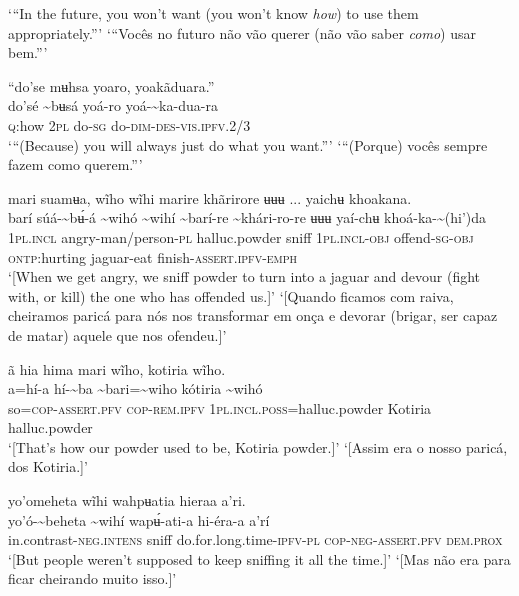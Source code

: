 \documentclass[output=paper,
modfonts,nonflat
]{langsci/langscibook}
\begin{document}
\glt ‘“In the future, you won't want (you won’t know \textit{how}) to use them appropriately.”’
\glt ‘“Vocês no futuro não vão querer (não vão saber \textit{como}) usar bem.”’
\z 

\ea “do'se mʉhsa yoaro, yoakãduara.” \\[.3em]
\gll do'sé	{\textasciitilde}bʉsá	yoá-ro	yoá-{\textasciitilde}ka-dua-ra \\
     \textsc{q:}how	2\textsc{pl}	do\textsc{-sg}	do-\textsc{dim-des-vis.ipfv.}2/3\\
\glt ‘“(Because) you will always just do what you want.”’
\glt ‘“(Porque) vocês sempre fazem como querem.”’
\z 

\ea mari suamʉa, wĩho wĩhi marire khãrirore ʉʉʉ ... yaichʉ khoakana. \\[.3em]
\gll {\textasciitilde}barí	súá-{\textasciitilde}bʉ́-á	{\textasciitilde}wihó	{\textasciitilde}wihí	{\textasciitilde}barí-re	{\textasciitilde}khári-ro-re	ʉʉʉ  yaí-chʉ	khoá-ka-{\textasciitilde}(hi')da \\
     1\textsc{pl.incl}	angry-man/person\textsc{-pl}	halluc.powder	sniff	1\textsc{pl.incl-obj}	offend\textsc{-sg-obj}	\textsc{ontp:}hurting jaguar-eat	finish-\textsc{assert.ipfv-emph}\\
\glt ‘[When we get angry, we sniff powder to turn into a jaguar and devour (fight with, or kill) the one who has offended us.]’
\glt ‘[Quando ficamos com raiva, cheiramos paricá para nós nos transformar em onça e devorar (brigar, ser capaz de matar) aquele que nos ofendeu.]’
\z 

\ea ã hia hima mari wĩho, kotiria wĩho.  \\[.3em]
\gll {\textasciitilde}a=hí-a	hí-{\textasciitilde}ba	{\textasciitilde}bari={\textasciitilde}wiho	kótiria	{\textasciitilde}wihó \\
     so=\textsc{cop-assert.pfv}	\textsc{cop-rem.ipfv}	1\textsc{pl.incl.poss}=halluc.powder	Kotiria	halluc.powder\\
\glt ‘[That's how our powder used to be, Kotiria powder.]’
\glt ‘[Assim era o nosso paricá, dos Kotiria.]’
\z 

\ea yo'omeheta wĩhi wahpʉatia hieraa a’ri.  \\[.3em]
\gll yo'ó-{\textasciitilde}beheta	{\textasciitilde}wihí	wapʉ́-ati-a	hi-éra-a	a’rí \\
     in.contrast\textsc{-neg.intens}	sniff	do.for.long.time-\textsc{ipfv-pl}	\textsc{cop-neg-assert.pfv}	\textsc{dem.prox}\\
\glt ‘[But people weren't supposed to keep sniffing it all the time.]’ 
\glt ‘[Mas não era para ficar cheirando muito isso.]’
\z
\end{document}
